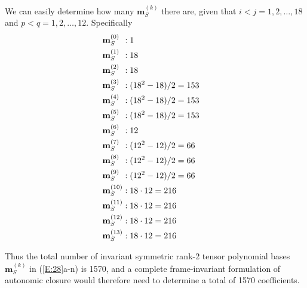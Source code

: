 We can easily determine how many  $\mathbf{m}^{(k)}_S$ there are, given that $i<j=1,2,\ldots,18$ and $p<q=1,2,\ldots,12$.  Specifically   	
%
\begin{subequations}
\label{E:39}
\begin{align}
	 \mathmakebox[\widthof{$\mathbf{m}^{(13)}_S$}][l]{\mathbf{m}^{(0)}_S}   &: 1 	&   	\\
	 \mathmakebox[\widthof{$\mathbf{m}^{(13)}_S$}][l]{\mathbf{m}^{(1)}_S}   &: 18 	&   	\\
	 \mathmakebox[\widthof{$\mathbf{m}^{(13)}_S$}][l]{\mathbf{m}^{(2)}_S}   &: 18 	&   	\\
	 \mathmakebox[\widthof{$\mathbf{m}^{(13)}_S$}][l]{\mathbf{m}^{(3)}_S}   &: (18^2 - 18)/2 = 153 	&   	\\
	 \mathmakebox[\widthof{$\mathbf{m}^{(13)}_S$}][l]{\mathbf{m}^{(4)}_S}   &: (18^2 - 18)/2 = 153  	&   	\\
	 \mathmakebox[\widthof{$\mathbf{m}^{(13)}_S$}][l]{\mathbf{m}^{(5)}_S}   &: (18^2 - 18)/2 = 153  	&   	\\
	 \mathmakebox[\widthof{$\mathbf{m}^{(13)}_S$}][l]{\mathbf{m}^{(6)}_S}   &: 12 	&   	\\
	 \mathmakebox[\widthof{$\mathbf{m}^{(13)}_S$}][l]{\mathbf{m}^{(7)}_S}   &: (12^2 - 12)/2 = 66 	&   	\\
	 \mathmakebox[\widthof{$\mathbf{m}^{(13)}_S$}][l]{\mathbf{m}^{(8)}_S}   &: (12^2 - 12)/2 = 66 	&   	\\
	 \mathmakebox[\widthof{$\mathbf{m}^{(13)}_S$}][l]{\mathbf{m}^{(9)}_S}   &: (12^2 - 12)/2 = 66 	&   	\\
	 \mathmakebox[\widthof{$\mathbf{m}^{(13)}_S$}][l]{\mathbf{m}^{(10)}_S}  &: 18 \cdot 12 = 216 	&   	\\
	 \mathmakebox[\widthof{$\mathbf{m}^{(13)}_S$}][l]{\mathbf{m}^{(11)}_S}  &: 18 \cdot 12 = 216 	&   	\\
	 \mathmakebox[\widthof{$\mathbf{m}^{(13)}_S$}][l]{\mathbf{m}^{(12)}_S}  &: 18 \cdot 12 = 216 	&   	\\
	 \mathmakebox[\widthof{$\mathbf{m}^{(13)}_S$}][l]{\mathbf{m}^{(13)}_S}  &: 18 \cdot 12 = 216 	&    
\end{align}
\end{subequations}
%
%    

Thus the total number of invariant symmetric rank-2 tensor polynomial bases $\mathbf{m}^{(k)}_S$  in (\ref{E:28}a-n) is 1570, and a complete frame-invariant formulation of autonomic closure would therefore need to determine a total of 1570 coefficients. 

